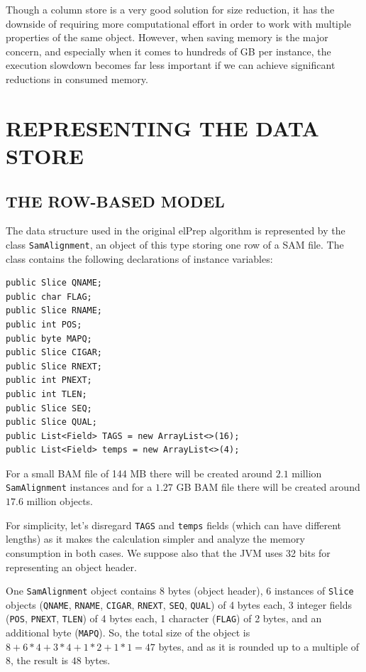 \documentclass[a4paper,twoside]{article}
\begin{document}
Though a column store is a very good solution for size reduction, it has the downside of requiring more computational effort in order to work with multiple properties of the same object.
However, when saving memory is the major concern, and especially when it comes to hundreds of GB per instance, the execution slowdown becomes far less important if we can achieve significant reductions in consumed memory.





\section{\uppercase{Representing the Data Store}}
\label{sec:model}

\subsection{\uppercase{The Row-Based Model}}
\label{subsec:row}

The data structure used in the original elPrep algorithm is represented by the class \texttt{SamAlignment}, an object of this type storing one row of a SAM file.
The class contains the following declarations of instance variables:

\begin{small}
\begin{verbatim}
public Slice QNAME;
public char FLAG;
public Slice RNAME;
public int POS;
public byte MAPQ;
public Slice CIGAR;
public Slice RNEXT;
public int PNEXT;
public int TLEN;
public Slice SEQ;
public Slice QUAL;
public List<Field> TAGS = new ArrayList<>(16);
public List<Field> temps = new ArrayList<>(4);
\end{verbatim}
\end{small}

For a small BAM file of 144 MB there will be created around $2.1$ million \texttt{SamAlignment} instances and for a $1.27$ GB BAM file there will be created around $17.6$ million objects.

For simplicity, let's disregard \texttt{TAGS} and \texttt{temps} fields (which can have different lengths) as it makes the calculation simpler and analyze the memory consumption in both cases.
We suppose also that the JVM uses 32 bits for representing an object header.

One {\texttt{SamAlignment}} object contains
8 bytes (object header), 6 instances of \texttt{Slice} objects (\texttt{QNAME}, \texttt{RNAME}, \texttt{CIGAR}, \texttt{RNEXT}, \texttt{SEQ}, \texttt{QUAL}) of 4 bytes each, 3 integer fields ({\texttt{POS}}, {\texttt{PNEXT}}, {\texttt{TLEN}}) of 4 bytes each, 1 character ({\texttt{FLAG}}) of 2 bytes, and an additional byte ({\texttt{MAPQ}}).
So, the total size of the object is $8 + 6 * 4 + 3*4  + 1 * 2+ 1 * 1 = 47$ bytes, and as it is rounded up to a multiple of $8$, the result is $48$ bytes.
\end{document}
